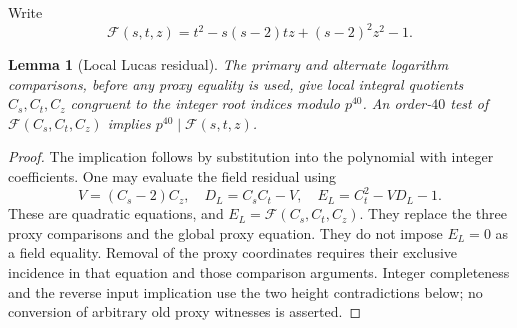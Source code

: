 \documentclass[11pt]{article}
\newtheorem{lemma}[theorem]{Lemma}
\theoremstyle{definition}
\theoremstyle{remark}
\begin{document}
Write
\[
 \mathcal F(s,t,z)=t^2-s(s-2)tz+(s-2)^2z^2-1.
\]
\begin{lemma}[Local Lucas residual]\label{lem:quartic-local-lucas}
The primary and alternate logarithm comparisons, before any proxy equality
is used, give local integral quotients $C_s,C_t,C_z$ congruent to the
integer root indices modulo $p^{40}$. An order-$40$ test of
$\mathcal F(C_s,C_t,C_z)$ implies $p^{40}\mid\mathcal F(s,t,z)$.
\end{lemma}
\begin{proof}
The implication follows by substitution into the polynomial with integer
coefficients. One may evaluate the field residual using
\[
 V=(C_s-2)C_z,\quad D_L=C_sC_t-V,\quad
 E_L=C_t^2-VD_L-1.
\]
These are quadratic equations, and $E_L=\mathcal F(C_s,C_t,C_z)$.
They replace the three proxy comparisons and the global proxy equation.
They do not impose $E_L=0$ as a field equality. Removal of the proxy
coordinates requires their exclusive incidence in that equation and those
comparison arguments. Integer completeness and the reverse input
implication use the two height contradictions below; no conversion of
arbitrary old proxy witnesses is asserted.
\end{proof}
\end{document}
